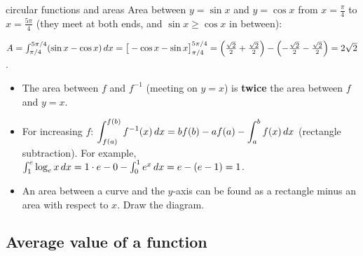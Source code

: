 \begin{example}{circular functions and areas \byhand}
Area between $y=\sin x$ and $y=\cos x$ from $x=\frac{\pi}{4}$ to $x=\frac{5\pi}{4}$ (they meet at both ends, and $\sin x\ge\cos x$ in between):\par
$A=\int_{\pi/4}^{5\pi/4}(\sin x-\cos x)\,dx=\big[-\cos x-\sin x\big]_{\pi/4}^{5\pi/4}=\left(\tfrac{\sqrt2}{2}+\tfrac{\sqrt2}{2}\right)-\left(-\tfrac{\sqrt2}{2}-\tfrac{\sqrt2}{2}\right)=2\sqrt2$.
\end{example}

\begin{tip}
\begin{itemize}
  \item The area between $f$ and $f^{-1}$ (meeting on $y=x$) is \textbf{twice} the area between $f$ and $y=x$.
  \item For increasing $f$: $\displaystyle\int_{f(a)}^{f(b)}f^{-1}(x)\,dx=bf(b)-af(a)-\int_a^bf(x)\,dx$ (rectangle subtraction). For example, $\int_1^e\log_e x\,dx=1\cdot e-0-\int_0^1e^x\,dx=e-(e-1)=1$.
  \item An area between a curve and the $y$-axis can be found as a rectangle minus an area with respect to $x$. Draw the diagram.
\end{itemize}
\end{tip}

\subsection{Average value of a function}
\label{sec:avg}

